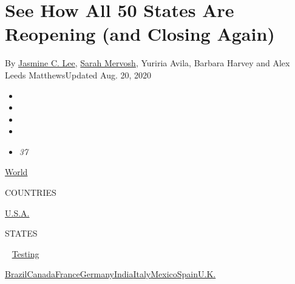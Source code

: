 \hypertarget{see-how-all-50-states-are-reopening-and-closing-again}{%
\section{See How All 50 States Are Reopening (and Closing
Again)}\label{see-how-all-50-states-are-reopening-and-closing-again}}

By \href{https://www.nytimes3xbfgragh.onion/by/jasmine-c-lee}{Jasmine C.
Lee}, \href{https://www.nytimes3xbfgragh.onion/by/sarah-mervosh}{Sarah
Mervosh}, Yuriria Avila, Barbara Harvey and Alex Leeds MatthewsUpdated
Aug. 20, 2020

\begin{itemize}
\item
\item
\item
\item
\item
  \emph{37}
\end{itemize}

\href{https://www.nytimes3xbfgragh.onion/interactive/2020/world/coronavirus-maps.html}{World}~

COUNTRIES

\textbar{}
\href{https://www.nytimes3xbfgragh.onion/interactive/2020/us/coronavirus-us-cases.html}{U.S.A.}~

STATES

~
\href{https://www.nytimes3xbfgragh.onion/interactive/2020/us/coronavirus-testing.html}{Testing}

\href{https://www.nytimes3xbfgragh.onion/interactive/2020/world/americas/brazil-coronavirus-cases.html}{Brazil}\href{https://www.nytimes3xbfgragh.onion/interactive/2020/world/canada/canada-coronavirus-cases.html}{Canada}\href{https://www.nytimes3xbfgragh.onion/interactive/2020/world/europe/france-coronavirus-cases.html}{France}\href{https://www.nytimes3xbfgragh.onion/interactive/2020/world/europe/germany-coronavirus-cases.html}{Germany}\href{https://www.nytimes3xbfgragh.onion/interactive/2020/world/asia/india-coronavirus-cases.html}{India}\href{https://www.nytimes3xbfgragh.onion/interactive/2020/world/europe/italy-coronavirus-cases.html}{Italy}\href{https://www.nytimes3xbfgragh.onion/interactive/2020/world/americas/mexico-coronavirus-cases.html}{Mexico}\href{https://www.nytimes3xbfgragh.onion/interactive/2020/world/europe/spain-coronavirus-cases.html}{Spain}\href{https://www.nytimes3xbfgragh.onion/interactive/2020/world/europe/united-kingdom-coronavirus-cases.html}{U.K.}


